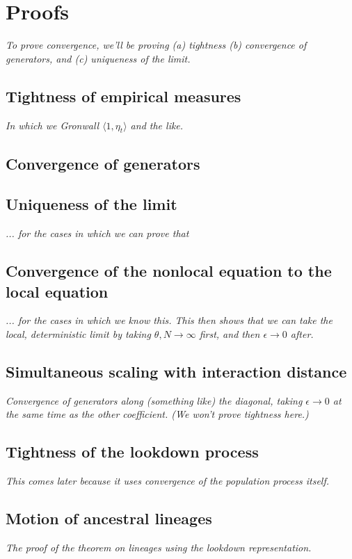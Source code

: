 \documentclass[12pt]{article}
\newcommand{\comment}[1]{{\color{blue} \it #1}}
\begin{document}
\section{Proofs}

\comment{
    To prove convergence, we'll be proving
    (a) tightness
    (b) convergence of generators, and
    (c) uniqueness of the limit.
}


\subsection{Tightness of empirical measures}

\comment{In which we Gronwall $\langle 1, \eta_t\rangle$ and the like.}

\subsection{Convergence of generators}


\subsection{Uniqueness of the limit}

\comment{... for the cases in which we can prove that}


\subsection{Convergence of the nonlocal equation to the local equation}

\comment{... for the cases in which we know this.
This then shows that we can take the local, deterministic limit
by taking $\theta, N \to \infty$ first, and then $\epsilon \to 0$ after.
}

\subsection{Simultaneous scaling with interaction distance}

\comment{
    Convergence of generators along (something like) the diagonal,
    taking $\epsilon \to 0$ at the same time as the other coefficient.
    (We won't prove tightness here.)
}

\subsection{Tightness of the lookdown process}

\comment{
    This comes later because it uses convergence of the population process itself.
}


\subsection{Motion of ancestral lineages}

\comment{
    The proof of the theorem on lineages using the lookdown representation.
}




\end{document}
